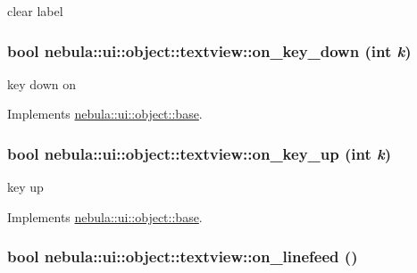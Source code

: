 clear label \hypertarget{classnebula_1_1ui_1_1object_1_1textview_a94196ab110d65359fe5721324f0f454d}{
\subsubsection[{on\_\-key\_\-down}]{\setlength{\rightskip}{0pt plus 5cm}bool nebula::ui::object::textview::on\_\-key\_\-down (int {\em k})}}
\label{classnebula_1_1ui_1_1object_1_1textview_a94196ab110d65359fe5721324f0f454d}


key down on 

Implements \hyperlink{classnebula_1_1ui_1_1object_1_1base_a239afd11ea6371cdf4551a4e3c99a84c}{nebula::ui::object::base}.\hypertarget{classnebula_1_1ui_1_1object_1_1textview_a00601569990afebe08f582b5fcebde08}{
\subsubsection[{on\_\-key\_\-up}]{\setlength{\rightskip}{0pt plus 5cm}bool nebula::ui::object::textview::on\_\-key\_\-up (int {\em k})}}
\label{classnebula_1_1ui_1_1object_1_1textview_a00601569990afebe08f582b5fcebde08}


key up 

Implements \hyperlink{classnebula_1_1ui_1_1object_1_1base_aa65861b29412bd80cb57a6cad8c12141}{nebula::ui::object::base}.\hypertarget{classnebula_1_1ui_1_1object_1_1textview_a50f65aa34f66c5baada483bb3bbc0360}{
\subsubsection[{on\_\-linefeed}]{\setlength{\rightskip}{0pt plus 5cm}bool nebula::ui::object::textview::on\_\-linefeed ()}}
\label{classnebula_1_1ui_1_1object_1_1textview_a50f65aa34f66c5baada483bb3bbc0360}


